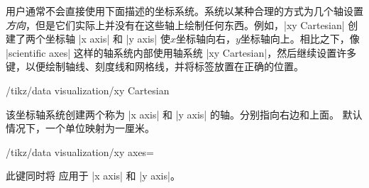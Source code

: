 
用户通常不会直接使用下面描述的坐标系统。系统以某种合理的方式为几个轴设置 \emph{方向}，但是它们实际上并没有在这些轴上绘制任何东西。例如，|xy Cartesian| 创建了两个坐标轴 |x axis| 和 |y axis| 使$x$坐标轴向右，$y$坐标轴向上。相比之下，像 |scientific axes| 这样的轴系统内部使用轴系统 |xy Cartesian|，然后继续设置许多键，以便绘制轴线、刻度线和网格线，并将标签放置在正确的位置。

\begin{key}{/tikz/data visualization/xy Cartesian}

    该坐标轴系统创建两个称为 |x axis| 和 |y axis| 的轴。分别指向右边和上面。 默认情况下，一个单位映射为一厘米。
\begin{codeexample}[preamble={\usetikzlibrary{datavisualization.formats.functions}}]
\end{codeexample}

    \begin{key}{/tikz/data visualization/xy axes=} %

        此键同时将  应用于 |x axis| 和 |y axis|。
    \end{key}
\end{key}

